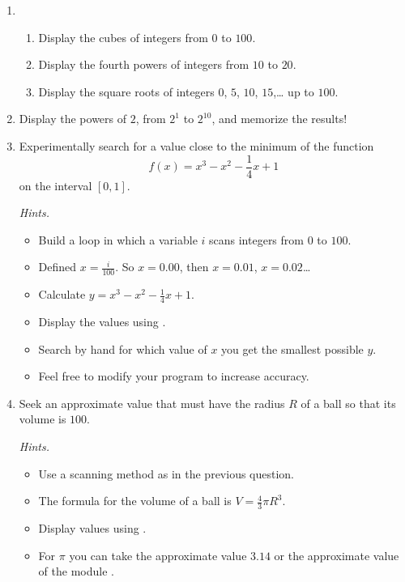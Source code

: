 \documentclass[11pt,class=report,crop=false]{standalone}
\begin{document}
\begin{activite}


\begin{enumerate}
  \item 
  \begin{enumerate}
    \item Display the cubes of integers from $0$ to $100$.
    \item Display the fourth powers of integers from $10$ to $20$.
    \item Display the square roots of integers $0$, $5$, $10$, $15$,\ldots{} up to $100$.   
  \end{enumerate}

  \item Display the powers of $2$, from $2^1$ to $2^{10}$, and memorize the results!
  
  
  \item Experimentally search for a value close to the minimum of the function 
  $$f(x) = x^3-x^2-\frac14x+1$$
   on the interval $[0,1]$.
  
  \emph{Hints.}
  \begin{itemize}
    \item Build a loop in which a variable $i$ scans integers from $0$ to $100$.
    \item Defined $x=\frac{i}{100}$. So $x=0.00$, then $x=0.01$, $x=0.02$\ldots
    \item Calculate $y = x^3-x^2-\frac14x+1$.
    \item Display the values using .
    \item Search by hand for which value of $x$ you get the smallest possible $y$.
    \item Feel free to modify your program to increase accuracy.
  \end{itemize}
    
  \item Seek an approximate value that must have
  the radius $R$ of a ball so that its volume is $100$.
  
  \emph{Hints.} 
  \begin{itemize}
    \item Use a scanning method as in the previous question.
    \item The formula for the volume of a ball is $V = \frac43 \pi R^3$.
    \item Display values using .    
    \item For $\pi$ you can take the approximate value $3.14$ or the approximate value  of the module .
  \end{itemize}
  
\end{enumerate}  
\end{activite}
\end{document}
